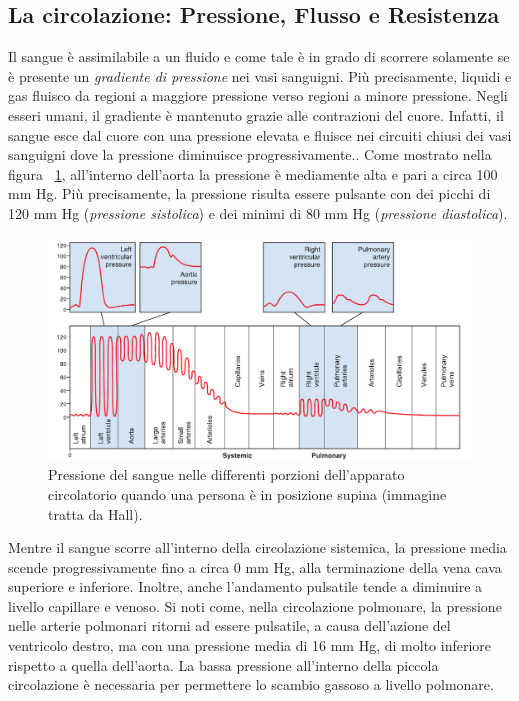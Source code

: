 \subsection{La circolazione: Pressione, Flusso e Resistenza}
Il sangue è assimilabile a un fluido e come tale è in grado di scorrere solamente se è presente un \textit{gradiente di pressione} nei vasi sanguigni. Più precisamente, liquidi e gas fluisco da regioni a maggiore pressione verso regioni a minore pressione. Negli esseri umani, il gradiente è mantenuto grazie alle contrazioni del cuore. Infatti, il sangue esce dal cuore con una pressione elevata e fluisce nei circuiti chiusi dei vasi sanguigni dove la pressione diminuisce progressivamente.\cite{SilverthornDeeUnglaub2020Fu:u}.
Come mostrato nella figura \Fig~\ref{fig:PressioneSangue}, all'interno dell'aorta la pressione è mediamente alta e pari a circa 100 mm Hg. Più precisamente, la pressione risulta essere pulsante con dei picchi di 120 mm Hg (\textit{pressione sistolica}) e dei minimi di 80 mm Hg (\textit{pressione diastolica}).
\begin{figure}[b!]
 	\centering
 	\includegraphics[width=0.9\linewidth]{ImageFiles/Fotopletismografia/PressioneSangue}
 	\caption{Pressione del sangue nelle differenti porzioni dell'apparato circolatorio quando una persona è in posizione supina (immagine tratta da Hall\cite{Hall2016}).}
 	\label{fig:PressioneSangue}
\end{figure}
Mentre il sangue scorre all'interno della circolazione sistemica, la pressione media scende progressivamente fino a circa 0 mm Hg, alla terminazione della vena cava superiore e inferiore. Inoltre, anche l'andamento pulsatile tende a diminuire a livello capillare e venoso. Si noti come, nella circolazione polmonare, la pressione nelle arterie polmonari ritorni ad essere pulsatile, a causa dell'azione del ventricolo destro, ma con una pressione media di 16 mm Hg, di molto inferiore rispetto a quella dell'aorta. La bassa pressione all'interno della piccola circolazione è necessaria per permettere lo scambio gassoso a livello polmonare.

